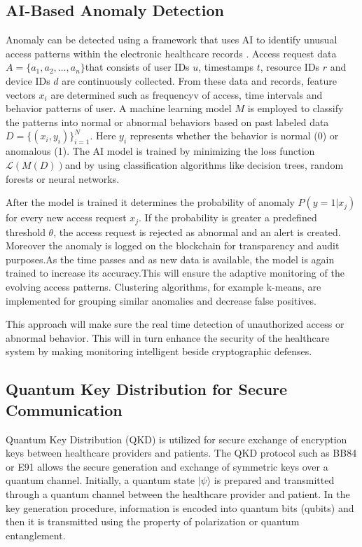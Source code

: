 \documentclass[pdflatex,sn-mathphys-num]{sn-jnl}%
\theoremstyle{thmstyleone}%
\theoremstyle{thmstyletwo}%
\theoremstyle{thmstylethree}%
\begin{document}





\subsection{AI-Based Anomaly Detection}
Anomaly can be detected using a framework that uses AI to identify unusual access patterns within the electronic healthcare records \cite{bib19}. Access request data \( A = \{a_1, a_2, \dots, a_n\} \)that consists of user IDs \( u \), timestamps \( t \), resource IDs \( r \) and device IDs \( d \) are continuously collected. From these data and records, feature vectors \( x_i \) are determined such as frequencyv of access, time intervals and behavior patterns of user. A machine learning model \( M \) is employed to classify the patterns into normal or abnormal behaviors based on past labeled data \( D = \{(x_i, y_i)\}_{i=1}^N \). Here \( y_i \) represents whether the behavior is normal (0) or anomalous (1). The AI model is trained by minimizing the loss function \( \mathcal{L}(M(D)) \)and by using classification algorithms like decision trees, random forests or neural networks\cite{bib18}.

After the model is trained it determines the probability of anomaly \( P(y=1|x_j) \) for every new access request \( x_j \). If the probability is greater a predefined threshold \( \theta \), the access request is rejected as abnormal and an alert is created. Moreover the anomaly is logged on the blockchain for transparency and audit purposes.As the time passes and as new data is available, the model is again trained to increase its accuracy.This will ensure the adaptive monitoring of the evolving access patterns. Clustering algorithms, for example k-means, are implemented for grouping similar anomalies and decrease false positives\cite{bib20}.

This approach will make sure the real time detection of unauthorized access or abnormal behavior. This will in turn enhance the security of the healthcare system by making  monitoring intelligent beside cryptographic defenses.




\subsection{Quantum Key Distribution for Secure Communication}
Quantum Key Distribution (QKD) is utilized for secure exchange of encryption keys between healthcare providers and patients\cite{bib21}. The QKD protocol such as BB84 or E91 allows the secure generation and exchange of symmetric keys over a quantum channel. Initially, a quantum state \( |\psi\rangle \) is prepared and transmitted through a quantum channel between the healthcare provider and patient. In the key generation procedure, information is encoded into quantum bits (qubits) and then it is transmitted using the property of polarization or quantum entanglement.
\end{document}
